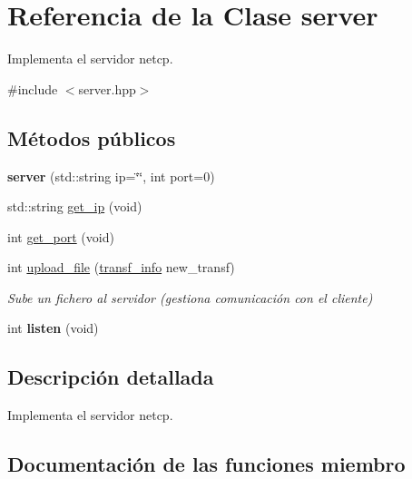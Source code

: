 \hypertarget{classserver}{}\section{Referencia de la Clase server}
\label{classserver}


Implementa el servidor netcp.  




{\ttfamily \#include $<$server.\+hpp$>$}

\subsection*{Métodos públicos}
\begin{DoxyCompactItemize}
\item 
\mbox{\label{classserver_a94f0de46df9f31016034c81e0014c06c}} 
{\bfseries server} (std\+::string ip=\char`\"{}\char`\"{}, int port=0)
\item 
std\+::string \hyperlink{classserver_aa3ffb6541d4295c59a04ca6d72a8bed4}{get\+\_\+ip} (void)
\item 
int \hyperlink{classserver_a85c34ce8e949d74f068025b11bd04bcc}{get\+\_\+port} (void)
\item 
\mbox{\label{classserver_ad7ef99cd7b0f7c529e501f34bd5d7f03}} 
int \hyperlink{classserver_ad7ef99cd7b0f7c529e501f34bd5d7f03}{upload\+\_\+file} (\hyperlink{structtransf__info}{transf\+\_\+info} new\+\_\+transf)
\begin{DoxyCompactList}\small\item\em Sube un fichero al servidor (gestiona comunicación con el cliente) \end{DoxyCompactList}\item 
\mbox{\label{classserver_a6104feb19c6f7f11938eb6d7ed28e5e6}} 
int {\bfseries listen} (void)
\end{DoxyCompactItemize}


\subsection{Descripción detallada}
Implementa el servidor netcp. 

\subsection{Documentación de las funciones miembro}
\mbox{\label{classserver_aa3ffb6541d4295c59a04ca6d72a8bed4}} 

